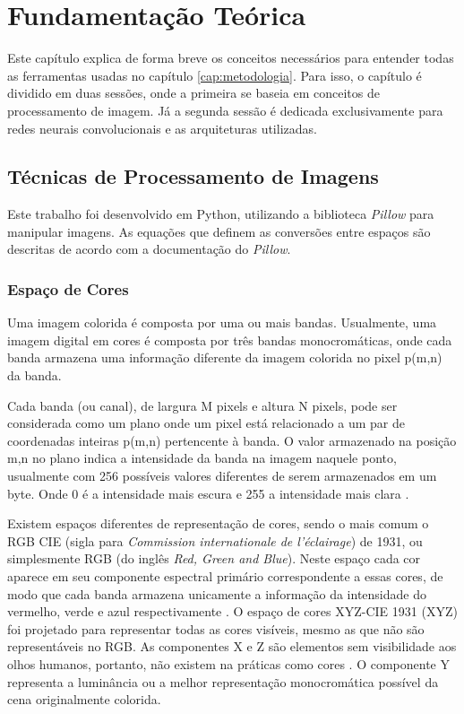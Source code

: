 \chapter{Fundamentação Teórica}\label{cap:fundamentação}

Este capítulo explica de forma breve os conceitos necessários para entender todas as ferramentas usadas no capítulo \ref{cap:metodologia}. 
Para isso, o capítulo é dividido em duas sessões, onde a primeira se baseia em conceitos de processamento de imagem. Já a segunda sessão é dedicada exclusivamente para redes neurais convolucionais e as arquiteturas utilizadas.

\section{Técnicas de Processamento de Imagens}

Este trabalho foi desenvolvido em Python, utilizando a biblioteca \textit{Pillow} para manipular imagens.
As equações que definem as conversões entre espaços são descritas de acordo com a documentação do \textit{Pillow}\cite{clark2015pillow}.
\subsection{Espaço de Cores}
Uma imagem colorida é composta por uma ou mais bandas. 
Usualmente, uma imagem digital em cores é composta por três bandas monocromáticas, onde cada banda armazena uma informação diferente da imagem colorida no pixel p(m,n) da banda. 

Cada banda (ou canal), de largura M pixels e altura N pixels, pode ser considerada como um plano onde um pixel está relacionado a um par de coordenadas inteiras p(m,n) pertencente à banda. 
O valor armazenado na posição m,n no plano indica a intensidade da banda na imagem naquele ponto, usualmente com 256 possíveis valores diferentes de serem armazenados em um byte. 
Onde 0 é a intensidade mais escura e 255 a intensidade mais clara \cite{jaelim, shapiro}.

Existem espaços diferentes de representação de cores, sendo o mais comum o RGB CIE (sigla para \textit{Commission internationale de l'éclairage}) de 1931, 
ou simplesmente RGB (do inglês \textit{Red, Green and Blue}). 
Neste espaço cada cor aparece em seu componente espectral primário correspondente a essas cores, de modo que cada banda armazena unicamente a informação da intensidade do vermelho, verde e azul respectivamente \cite{gonzalez, jaelim}. 
O espaço de cores XYZ-CIE 1931 (XYZ) foi projetado para representar todas as cores visíveis, mesmo as que não são representáveis no RGB. 
As componentes X e Z são elementos sem visibilidade aos olhos humanos, portanto, não existem na práticas como cores \cite{ohta}. 
O componente Y representa a luminância ou a melhor representação monocromática possível da cena originalmente colorida.

